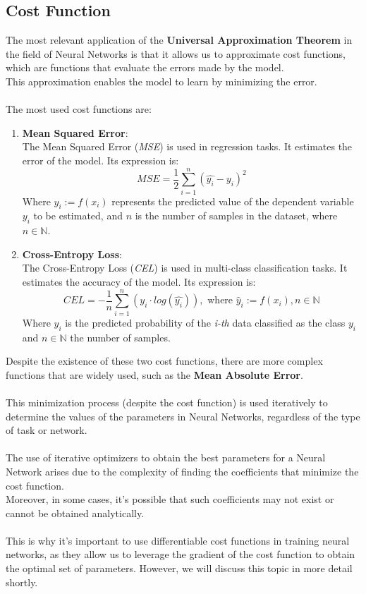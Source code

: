 \documentclass[a4paper, 11pt]{article}
\begin{document}
\subsection{Cost Function}
The most relevant application of the \textbf{Universal Approximation Theorem} in the field of Neural Networks is that it allows us to approximate cost functions, which are functions that evaluate the errors made by the model.\\
This approximation enables the model to learn by minimizing the error.\\\\
The most used cost functions are:
\begin{enumerate}
    \item \textbf{Mean Squared Error}:\\
    The Mean Squared Error (\textit{MSE}) is used in regression tasks. It estimates the error of the model. Its expression is:
    \begin{equation}
        MSE = \frac{1}{2} \sum_{i = 1}^{n} \left( \hat{y_i} - y_i \right)^2
    \end{equation}
    Where $ \hat{y}_i := f(x_i)$ represents the predicted value of the dependent variable $y_i$ to be estimated, and $n$ is the number of samples in the dataset, where $n\in\mathbb{N}$.
    \item \textbf{Cross-Entropy Loss}:\\
    The Cross-Entropy Loss (\textit{CEL}) is used in multi-class classification tasks. It estimates the accuracy of the model. Its expression is:
    \begin{equation}
        CEL = - \frac{1}{n} \sum_{i=1}^n \left(  y_{i} \cdot log(\hat{y_{i}}) \right), \text{ where } \hat{y}_i := f(x_i), n\in \mathbb{N}
    \end{equation}
     Where $ \hat{y}_i$ is the predicted probability of the \textit{i-th} data classified as the class $y_i$ and $n\in\mathbb{N}$ the number of samples.\\
\end{enumerate}
Despite the existence of these two cost functions, there are more complex functions that are widely used, such as the \textbf{Mean Absolute Error}.\\\\
This minimization process (despite the cost function) is used iteratively to determine the values of the parameters in Neural Networks, regardless of the type of task or network.\\\\
The use of iterative optimizers to obtain the best parameters for a Neural Network arises due to the complexity of finding the coefficients that minimize the cost function.\\ Moreover, in some cases, it's possible that such coefficients may not exist or cannot be obtained analytically.\\\\
This is why it's important to use differentiable cost functions in training neural networks, as they allow us to leverage the gradient of the cost function to obtain the optimal set of parameters. However, we will discuss this topic in more detail shortly.
\newpage
\end{document}
